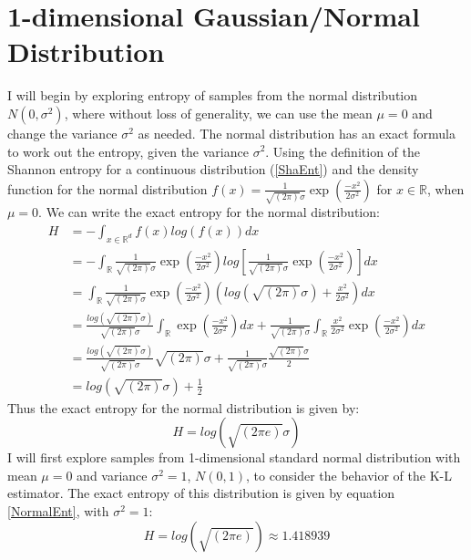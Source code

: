 \documentclass[12pt]{report}
\begin{document}
\section{1-dimensional Gaussian/Normal Distribution} \label{Normal_d=1}

I will begin by exploring entropy of samples from the normal distribution $N(0, \sigma^2)$, where without loss of generality, we can use the mean $\mu = 0$ and change the variance $\sigma^2$ as needed. The normal distribution has an exact formula to work out the entropy, given the variance $\sigma^2$. Using the definition of the Shannon entropy for a continuous distribution (\ref{ShaEnt}) and the density function for the normal distribution $f(x) = \frac{1}{\sqrt{(2\pi)} \sigma}\exp{ \left( \frac{-x^2}{2\sigma^2} \right)}$ for $x \in \mathbb{R}$, when $\mu = 0$. We can write the exact entropy for the normal distribution:
\begin{align}
H &= - \int_{x \in \mathbb{R}^d} f(x) log(f(x)) dx \nonumber \\
&= - \int_{\mathbb{R}} \frac{1}{\sqrt{(2\pi)} \sigma}\exp{ \left( \frac{-x^2}{2\sigma^2} \right)} log \left[\frac{1}{\sqrt{(2\pi)} \sigma}\exp{ \left( \frac{-x^2}{2\sigma^2} \right)} \right] dx \nonumber \\
&=  \int_{\mathbb{R}} \frac{1}{\sqrt{(2\pi)} \sigma}\exp{ \left( \frac{-x^2}{2\sigma^2} \right)} \left( log(\sqrt{(2\pi)}\sigma) +  \frac{x^2}{2\sigma^2} \right) dx \nonumber \\
&= \frac{log(\sqrt{(2\pi)}\sigma)}{\sqrt{(2\pi)} \sigma} \int_{\mathbb{R}} \exp{ \left( \frac{-x^2}{2\sigma^2} \right)} dx +  \frac{1}{\sqrt{(2\pi)} \sigma} \int_{\mathbb{R}} \frac{x^2}{2\sigma^2}  \exp{ \left( \frac{-x^2}{2 \sigma^2} \right)} dx \nonumber \\
&= \frac{log(\sqrt{(2\pi)}\sigma)}{\sqrt{(2\pi)} \sigma} \sqrt{(2 \pi)} \sigma + \frac{1}{\sqrt{(2\pi)} \sigma} \frac{\sqrt{(2\pi)} \sigma}{2} \nonumber \\
&=  log(\sqrt{(2\pi)}\sigma) + \frac{1}{2} \nonumber 
\end{align}
Thus the exact entropy for the normal distribution is given by:
\begin{equation}\label{NormalEnt}
H =  log(\sqrt{(2\pi e)}\sigma) 
\end{equation}
I will first explore samples from 1-dimensional standard normal distribution with mean $\mu = 0$ and variance $\sigma^2 = 1$, $N(0, 1)$, to consider the behavior of the K-L estimator. The exact entropy of this distribution is given by equation \ref{NormalEnt}, with $\sigma^2=1$:
\begin{equation} \label{normal_exact}
H = log(\sqrt{(2\pi e)}) \approx 1.418939
\end{equation}
\end{document}
